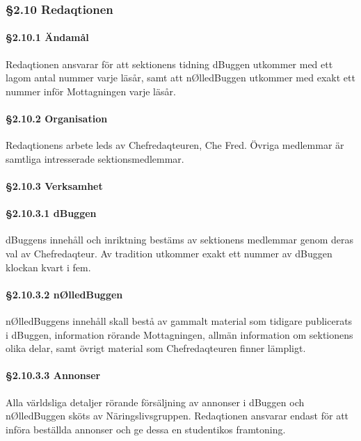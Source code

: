 \subsubsection{§2.10 Redaqtionen}

\paragraph{§2.10.1 Ändamål}

Redaqtionen ansvarar för att sektionens tidning dBuggen utkommer med ett lagom antal nummer varje läsår, samt att nØlledBuggen utkommer med exakt ett nummer inför Mottagningen varje läsår.

\paragraph{§2.10.2 Organisation}

Redaqtionens arbete leds av Chefredaqteuren, Che Fred. Övriga medlemmar är samtliga intresserade sektionsmedlemmar.

\paragraph{§2.10.3 Verksamhet}

\paragraph{§2.10.3.1 dBuggen}

dBuggens innehåll och inriktning bestäms av sektionens medlemmar genom deras val av Chefredaqteur. Av tradition utkommer exakt ett nummer av dBuggen klockan kvart i fem.

\paragraph{§2.10.3.2 nØlledBuggen}

nØlledBuggens innehåll skall bestå av gammalt material som tidigare publicerats i dBuggen, information rörande Mottagningen, allmän information om sektionens olika delar, samt övrigt material som Chefredaqteuren finner lämpligt.

\paragraph{§2.10.3.3 Annonser}

Alla världsliga detaljer rörande försäljning av annonser i dBuggen och nØlledBuggen sköts av Näringslivsgruppen. Redaqtionen ansvarar endast för att införa beställda annonser och ge dessa en studentikos framtoning.

